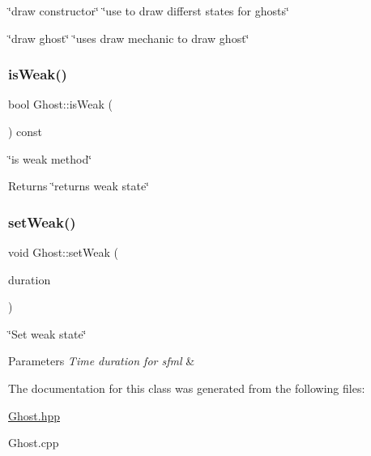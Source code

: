 \char`\"{}draw constructor\char`\"{}  \char`\"{}use to draw differst states for ghosts\char`\"{} 

\char`\"{}draw ghost\char`\"{}  \char`\"{}uses draw mechanic to draw ghost\char`\"{} \mbox{\label{classGhost_af0cf8b5a66a4a390746f43238b96fe55}} 
\subsubsection{\texorpdfstring{is\+Weak()}{isWeak()}}
{\footnotesize\ttfamily bool Ghost\+::is\+Weak (\begin{DoxyParamCaption}{ }\end{DoxyParamCaption}) const}



\char`\"{}is weak method\char`\"{} 

\begin{DoxyReturn}{Returns}
\char`\"{}returns weak state\char`\"{} 
\end{DoxyReturn}
\mbox{\label{classGhost_a4f563124a7b39bc1fea2553430e76c24}} 
\subsubsection{\texorpdfstring{set\+Weak()}{setWeak()}}
{\footnotesize\ttfamily void Ghost\+::set\+Weak (\begin{DoxyParamCaption}\item[{sf\+::\+Time}]{duration }\end{DoxyParamCaption})}



\char`\"{}\+Set weak state\char`\"{} 


\begin{DoxyParams}{Parameters}
{\em Time duration for sfml} & \\
\hline
\end{DoxyParams}


The documentation for this class was generated from the following files\+:\begin{DoxyCompactItemize}
\item 
\hyperlink{Ghost_8hpp}{Ghost.\+hpp}\item 
Ghost.\+cpp\end{DoxyCompactItemize}
